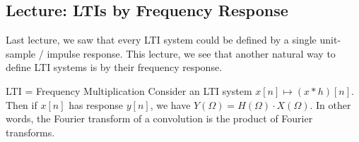 \subsection{Lecture: LTIs by Frequency Response}

Last lecture, we saw that every LTI system could be defined
by a single unit-sample / impulse response.
This lecture, we see that another natural way to define LTI systems
is by their frequency response.

\begin{theorem}{LTI = Frequency Multiplication}
    Consider an LTI system $x[n] \mapsto (x * h)[n]$.
    Then if $x[n]$ has response $y[n]$,
    we have $Y(\Omega) = H(\Omega) \cdot X(\Omega)$.
    In other words,
    the Fourier transform of a convolution
    is the product of Fourier transforms.
\end{theorem}

